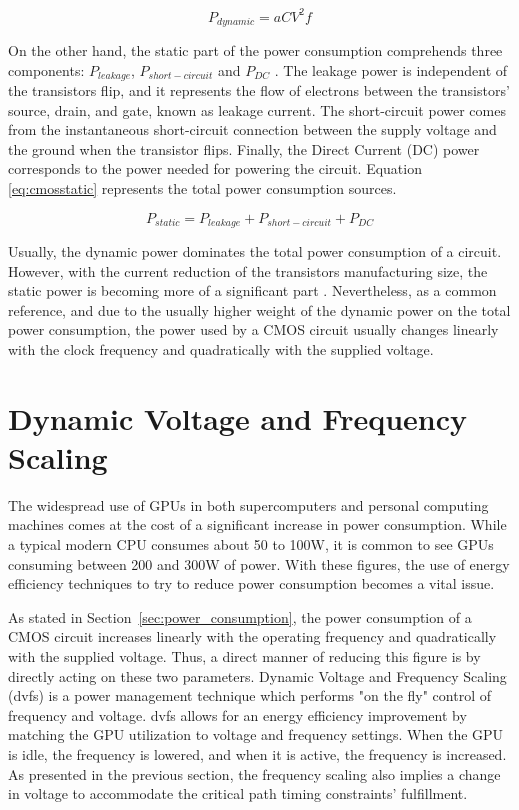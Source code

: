 \begin{equation}
    P_{dynamic} = aCV^2f
    \label{eq:dynpower}
\end{equation}

On the other hand, the static part of the power consumption comprehends three components: $P_{leakage}$, $P_{short-circuit}$ and $P_{DC}$ \cite{mei_survey_2016}. The leakage power is independent of the transistors flip, and it represents the flow of electrons between the transistors' source, drain, and gate, known as leakage current. The short-circuit power comes from the instantaneous short-circuit connection between the supply voltage and the ground when the transistor flips. Finally, the Direct Current (DC) power corresponds to the power needed for powering the circuit. Equation \ref{eq:cmosstatic} represents the total power consumption sources.

\begin{equation}
    P_{static} = P_{leakage} + P_{short-circuit} + P_{DC}
    \label{eq:cmosstatic}
\end{equation}

Usually, the dynamic power dominates the total power consumption of a circuit. However, with the current reduction of the transistors manufacturing size, the static power is becoming more of a significant part \cite{s._hong_modeling_2012} \cite{hong_integrated_2010}. Nevertheless, as a common reference, and due to the usually higher weight of the dynamic power on the total power consumption, the power used by a CMOS circuit usually changes linearly with the clock frequency and quadratically with the supplied voltage.


\section{Dynamic Voltage and Frequency Scaling}
\label{section:DVFS}

The widespread use of GPUs in both supercomputers and personal computing machines comes at the cost of a significant increase in power consumption. While a typical modern CPU consumes about 50 to 100W, it is common to see GPUs consuming between 200 and 300W of power. With these figures, the use of energy efficiency techniques to try to reduce power consumption becomes a vital issue.

As stated in Section~\ref{sec:power_consumption}, the power consumption of a CMOS circuit increases linearly with the operating frequency and quadratically with the supplied voltage. Thus, a direct manner of reducing this figure is by directly acting on these two parameters. 
Dynamic Voltage and Frequency Scaling (\acrshort{dvfs}) is a power management technique which performs "on the fly" control of frequency and voltage. \acrshort{dvfs} allows for an energy efficiency improvement by matching the GPU utilization to voltage and frequency settings. When the GPU is idle, the frequency is lowered, and when it is active, the frequency is increased. As presented in the previous section, the frequency scaling also implies a change in voltage to accommodate the critical path timing constraints' fulfillment. 

